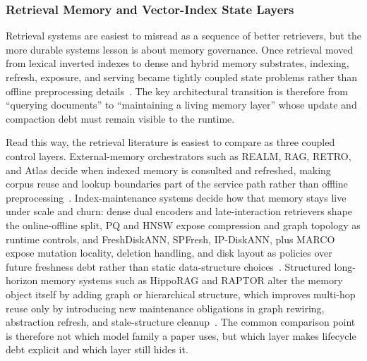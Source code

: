 \documentclass[acmsmall,screen,review]{acmart}
\begin{document}
\subsubsection{Retrieval Memory and Vector-Index State Layers}

Retrieval systems are easiest to misread as a sequence of better retrievers, but the more durable systems lesson is about memory governance. Once retrieval moved from lexical inverted indexes to dense and hybrid memory substrates, indexing, refresh, exposure, and serving became tightly coupled state problems rather than offline preprocessing details~\cite{karpukhin2020dpr,khattab2020colbert,guu2020realm,lewis2020rag}. The key architectural transition is therefore from ``querying documents'' to ``maintaining a living memory layer'' whose update and compaction debt must remain visible to the runtime.

Read this way, the retrieval literature is easiest to compare as three coupled control layers. External-memory orchestrators such as REALM, RAG, RETRO, and Atlas decide when indexed memory is consulted and refreshed, making corpus reuse and lookup boundaries part of the service path rather than offline preprocessing~\cite{guu2020realm,lewis2020rag,borgeaud2022retro,izacard2022atlas}. Index-maintenance systems decide how that memory stays live under scale and churn: dense dual encoders and late-interaction retrievers shape the online-offline split, PQ and HNSW expose compression and graph topology as runtime controls, and FreshDiskANN, SPFresh, IP-DiskANN, plus MARCO expose mutation locality, deletion handling, and disk layout as policies over future freshness debt rather than static data-structure choices~\cite{karpukhin2020dpr,khattab2020colbert,jegou2011pq,malkov2020hnsw,singh2021freshdiskann,xu2023spfresh,xu2025place,yue2025marco}. Structured long-horizon memory systems such as HippoRAG and RAPTOR alter the memory object itself by adding graph or hierarchical structure, which improves multi-hop reuse only by introducing new maintenance obligations in graph rewiring, abstraction refresh, and stale-structure cleanup~\cite{wang2024hipporag,sarthi2024raptor}. The common comparison point is therefore not which model family a paper uses, but which layer makes lifecycle debt explicit and which layer still hides it.
\end{document}
